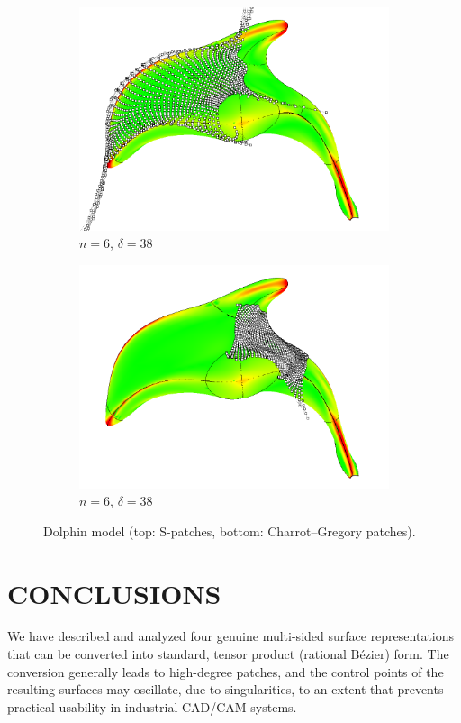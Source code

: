 \documentclass[9pt,academicons]{article}
\begin{document}
\begin{figure}[!ht]
  {
    \hfill
    \begin{subfigure}{.45\textwidth}
      \centering
      \includegraphics[width=\textwidth]{images/dolphin/cg1.png}
      \caption{$n=6$, $\delta=38$}
      \label{fig:dolphin-3-cg}
    \end{subfigure}
    \hfill
    \begin{subfigure}{.45\textwidth}
      \centering
      \includegraphics[width=\textwidth]{images/dolphin/cg2.png}
      \caption{$n=6$, $\delta=38$}
      \label{fig:dolphin-5-cg}
    \end{subfigure}
    \hfill
  }
  \caption{Dolphin model (top: S-patches, bottom: Charrot--Gregory patches).}
  \label{fig:dolphin}
\end{figure}

\section{CONCLUSIONS}
We have described and analyzed four genuine multi-sided surface representations
that can be converted into standard, tensor product (rational B\'ezier) form.
The conversion generally leads to high-degree patches, and the
control points of the resulting surfaces may oscillate, due to singularities,
to an extent that prevents practical usability in industrial CAD/CAM systems.
\end{document}
